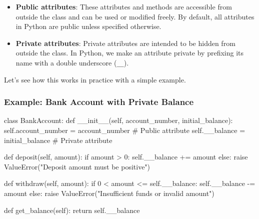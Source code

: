 \documentclass[
  letterpaper,
  DIV=11,
  numbers=noendperiod]{scrreprt}
\newenvironment{Shaded}{\begin{snugshade}}{\end{snugshade}}
\newcommand{\CommentTok}[1]{\textcolor[rgb]{0.37,0.37,0.37}{#1}}
\newcommand{\ControlFlowTok}[1]{\textcolor[rgb]{0.00,0.23,0.31}{#1}}
\newcommand{\DecValTok}[1]{\textcolor[rgb]{0.68,0.00,0.00}{#1}}
\newcommand{\FunctionTok}[1]{\textcolor[rgb]{0.28,0.35,0.67}{#1}}
\newcommand{\KeywordTok}[1]{\textcolor[rgb]{0.00,0.23,0.31}{#1}}
\newcommand{\NormalTok}[1]{\textcolor[rgb]{0.00,0.23,0.31}{#1}}
\newcommand{\OperatorTok}[1]{\textcolor[rgb]{0.37,0.37,0.37}{#1}}
\newcommand{\PreprocessorTok}[1]{\textcolor[rgb]{0.68,0.00,0.00}{#1}}
\newcommand{\StringTok}[1]{\textcolor[rgb]{0.13,0.47,0.30}{#1}}
\newcommand{\VariableTok}[1]{\textcolor[rgb]{0.07,0.07,0.07}{#1}}
\providecommand{\tightlist}{%
  \setlength{\itemsep}{0pt}\setlength{\parskip}{0pt}}\usepackage{longtable,booktabs,array}
\begin{document}
\begin{itemize}
\tightlist
\item
  \textbf{Public attributes}: These attributes and methods are
  accessible from outside the class and can be used or modified freely.
  By default, all attributes in Python are public unless specified
  otherwise.
\item
  \textbf{Private attributes}: Private attributes are intended to be
  hidden from outside the class. In Python, we make an attribute private
  by prefixing its name with a double underscore (\texttt{\_\_}).
\end{itemize}

Let's see how this works in practice with a simple example.

\hypertarget{example-bank-account-with-private-balance}{%
\subsubsection{Example: Bank Account with Private
Balance}\label{example-bank-account-with-private-balance}}

\begin{Shaded}
\begin{Highlighting}[]
\KeywordTok{class}\NormalTok{ BankAccount:}
    \KeywordTok{def} \FunctionTok{\_\_init\_\_}\NormalTok{(}\VariableTok{self}\NormalTok{, account\_number, initial\_balance):}
        \VariableTok{self}\NormalTok{.account\_number }\OperatorTok{=}\NormalTok{ account\_number  }\CommentTok{\# Public attribute}
        \VariableTok{self}\NormalTok{.\_\_balance }\OperatorTok{=}\NormalTok{ initial\_balance  }\CommentTok{\# Private attribute}

    \KeywordTok{def}\NormalTok{ deposit(}\VariableTok{self}\NormalTok{, amount):}
        \ControlFlowTok{if}\NormalTok{ amount }\OperatorTok{\textgreater{}} \DecValTok{0}\NormalTok{:}
            \VariableTok{self}\NormalTok{.\_\_balance }\OperatorTok{+=}\NormalTok{ amount}
        \ControlFlowTok{else}\NormalTok{:}
            \ControlFlowTok{raise} \PreprocessorTok{ValueError}\NormalTok{(}\StringTok{"Deposit amount must be positive"}\NormalTok{)}

    \KeywordTok{def}\NormalTok{ withdraw(}\VariableTok{self}\NormalTok{, amount):}
        \ControlFlowTok{if} \DecValTok{0} \OperatorTok{\textless{}}\NormalTok{ amount }\OperatorTok{\textless{}=} \VariableTok{self}\NormalTok{.\_\_balance:}
            \VariableTok{self}\NormalTok{.\_\_balance }\OperatorTok{{-}=}\NormalTok{ amount}
        \ControlFlowTok{else}\NormalTok{:}
            \ControlFlowTok{raise} \PreprocessorTok{ValueError}\NormalTok{(}\StringTok{"Insufficient funds or invalid amount"}\NormalTok{)}

    \KeywordTok{def}\NormalTok{ get\_balance(}\VariableTok{self}\NormalTok{):}
        \ControlFlowTok{return} \VariableTok{self}\NormalTok{.\_\_balance}
\end{Highlighting}
\end{Shaded}
\end{document}
